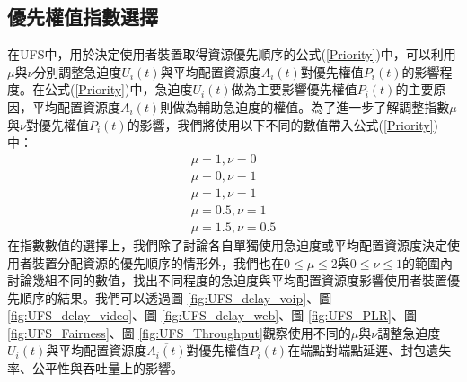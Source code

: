 \subsection{優先權值指數選擇}
在UFS中，用於決定使用者裝置取得資源優先順序的公式(\ref{Priority})中，可以利用$\mu$與$\nu$分別調整急迫度$U_i(t)$與平均配置資源度$\overline{A_i(t)}$對優先權值$P_i(t)$的影響程度。在公式(\ref{Priority})中，急迫度$U_i(t)$做為主要影響優先權值$P_i(t)$的主要原因，平均配置資源度$\overline{A_i(t)}$則做為輔助急迫度的權值。為了進一步了解調整指數$\mu$與$\nu$對優先權值$P_i(t)$的影響，我們將使用以下不同的數值帶入公式(\ref{Priority})中：
\begin{equation}
\left . 
\begin{array}{l} 
\mu=1,\nu=0
 \\ 
\mu=0,\nu=1
 \\ 
\mu=1,\nu=1
 \\ 
\mu=0.5,\nu=1
 \\ 
\mu=1.5,\nu=0.5
\end{array}\right .
\end{equation}
在指數數值的選擇上，我們除了討論各自單獨使用急迫度或平均配置資源度決定使用者裝置分配資源的優先順序的情形外，我們也在$0\leq\mu\leq 2$與$0\leq\nu\leq 1$的範圍內討論幾組不同的數值，找出不同程度的急迫度與平均配置資源度影響使用者裝置優先順序的結果。我們可以透過圖 \ref{fig:UFS_delay_voip}、圖 \ref{fig:UFS_delay_video}、圖 \ref{fig:UFS_delay_web}、圖 \ref{fig:UFS_PLR}、圖 \ref{fig:UFS_Fairness}、圖 \ref{fig:UFS_Throughput}觀察使用不同的$\mu$與$\nu$調整急迫度$U_i(t)$與平均配置資源度$\overline{A_i(t)}$對優先權值$P_i(t)$在端點對端點延遲、封包遺失率、公平性與吞吐量上的影響。
